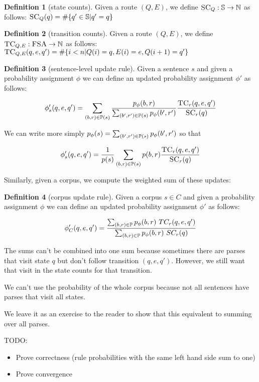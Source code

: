 \documentclass[12pt]{article}
\theoremstyle{definition}
\newtheorem{definition}{Definition}[section]
\begin{document}
\begin{definition}[state counts]
  Given a route $(Q,E)$, we define $\textsc{SC}_Q : \mathbb{S} \rightarrow\mathbb{N}$ as follows: $\textsc{SC}_Q(q) = \#\{ q'\in \mathbb{S} | q'=q \}$
\end{definition}


\begin{definition}[transition counts]
  Given a route $(Q,E)$, we define $\textsc{TC}_{Q,E} : \textsc{FSA} \rightarrow\mathbb{N}$ as follows: $\textsc{TC}_{Q,E}(q,e,q') = \#\{ i<n | Q(i)=q,E(i)=e,Q({i+1})=q'\}$
\end{definition}


\begin{definition}[sentence-level update rule]
  Given a sentence $s$ and given a probability assignment $\phi$ we can define an updated probability assignment $\phi'$ as follows:

  $$\phi_s'(q,e,q') = \sum_{(b,r)\in\mathbb{P}(s)}\frac{p_\phi(b,r)}{\sum_{(b',r')\in\mathbb{P}(s)}p_\phi(b',r')}\frac{\textsc{TC}_r(q,e,q')}{\textsc{SC}_r(q)}$$
\end{definition}

We can write more simply $p_\phi(s)=\sum_{(b',r')\in\mathbb{P}(s)}p_\phi(b',r')$ so that

$$\phi_s'(q,e,q') = \frac{1}{p(s)}\sum_{(b,r)\in\mathbb{P}(s)}p(b,r)\frac{\textsc{TC}_r(q,e,q')}{\textsc{SC}_r(q)}$$


Similarly, given a corpus, we compute the weighted sum of these updates:
\begin{definition}[corpus update rule]
  Given a corpus $s\in C$ and given a probability assignment $\phi$ we can define an updated probability assignment $\phi'$ as follows:

 $$\phi_C'(q,e,q') = \frac{\sum_{(b,r)\in\mathbb{P}} p_\phi(b,r)~ TC_r(q,e,q')}{\sum_{(b,r)\in\mathbb{P}} p_\phi(b,r)~ SC_r(q)}$$ 


\end{definition}

The sums can't be combined into one sum because sometimes there are parses that visit state $q$ but don't follow transition $(q,e,q')$. However, we still want that visit in the state counts for that transition.

We can't use the probability of the whole corpus because not all sentences have parses that visit all states.



We leave it as an exercise to the reader to show that this equivalent to summing over all parses.


TODO:
\begin{itemize}
\item Prove correctness (rule probabilities with the same left hand side sum to one)
\item Prove convergence
\end{itemize}
\end{document}
